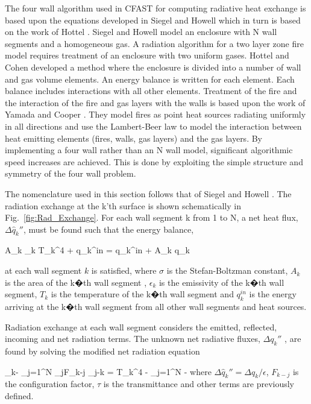 The four wall algorithm used in CFAST for computing radiative heat exchange is based upon the equations developed in Siegel and Howell \cite{SiegelandHowell:1981} which in turn is based on the work of Hottel \cite{Hottel:1954}. Siegel and Howell model an enclosure with N wall segments and a homogeneous gas. A radiation algorithm for a two layer zone fire model requires treatment of an enclosure with two uniform gases.  Hottel and Cohen \cite{Hottel:1958} developed a method where the enclosure is divided into a number of wall and gas volume elements. An energy balance is written for each element. Each balance includes interactions with all other elements.  Treatment of the fire and the interaction of the fire and gas layers with the walls is based upon the work of Yamada and Cooper \cite{Yamada:1990}.  They model fires as point heat sources radiating uniformly in all directions and use the Lambert-Beer law to model the interaction between heat emitting elements (fires, walls, gas layers) and the gas layers. By implementing a four wall rather than an N wall model, significant algorithmic speed increases are achieved.  This is done by exploiting the simple structure and symmetry of the four wall problem.

The nomenclature used in this section follows that of Siegel and Howell \cite{SiegelandHowell:1981}.  The radiation exchange at the k'th surface is shown schematically in Fig.~\ref{fig:Rad_Exchange}.  For each wall segment k from 1 to N, a net heat flux, $\Delta \hat{q}_k\dprime$, must be found such that the energy balance,

\be \sigma A_k \epsilon_k T_k^4 + q_k^{in} = q_k^{in} + A_k \Delta q_k\dprime \ee

at each wall segment $k$ is satisfied, where $\sigma$ is the Stefan-Boltzman constant, $A_k$ is the area of the k�th wall segment , $\epsilon_k$ is the emissivity of the k�th wall segment, $T_k$ is the temperature of the k�th wall segment and $q_k^{in}$ is the energy arriving at the k�th wall segment from all other wall segments and heat sources.

Radiation exchange at each wall segment considers the emitted, reflected, incoming and net radiation terms.  The unknown net radiative fluxes, $\Delta q_k\dprime$ , are found by solving the modified net radiation equation

\be \Delta {}_k\dprime - \displaystyle\sum_{j=1}^N  \Delta {}_j\dprime F_{k-j} \tau_{j-k} = \sigma T_k^4 - \displaystyle\sum_{j=1}^N  -  \ee
where $\Delta \hat{q}_k\dprime = \Delta q_k / \epsilon$, $F_{k-j}$ is the configuration factor, $\tau$ is the transmittance and other terms are previously defined.

